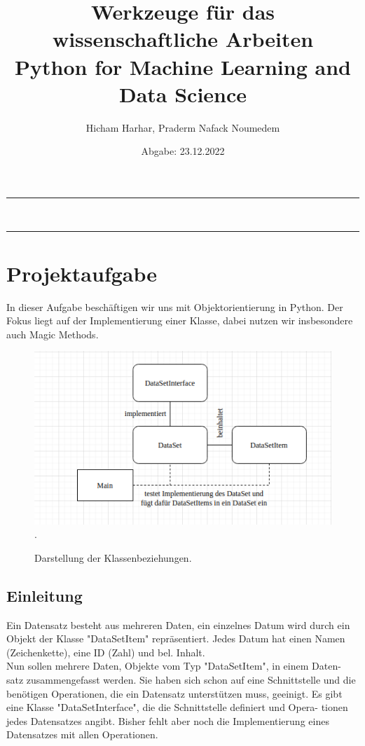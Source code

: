 \documentclass{article}
\title{Werkzeuge für das wissenschaftliche Arbeiten \\  {\large Python for Machine Learning and Data Science} }
\author{ {\large Hicham Harhar, Praderm Nafack Noumedem} }
\date{Abgabe: 23.12.2022}
\begin{document}
	
	\maketitle
\hrule\hfill\\	
	
	\tableofcontents
\hrule

	

\section{Projektaufgabe}
	In dieser Aufgabe beschäftigen wir uns mit Objektorientierung in Python. Der
	Fokus liegt auf der Implementierung einer Klasse, dabei nutzen wir insbesondere
	auch Magic Methods.
\begin{figure}[H]
		\begin{minipage}{\linewidth}
			\renewcommand{\footnoterule}{}
			\begin{center}
				\includegraphics[width=0.75\linewidth]{1.png}.
			\end{center}
			\caption[Darstellung der Klassenbeziehungen] {Darstellung der Klassenbeziehungen.}
		\end{minipage}
\end{figure}
\subsection{Einleitung}
Ein Datensatz besteht aus mehreren Daten, ein einzelnes Datum wird durch ein
Objekt der Klasse "DataSetItem" repräsentiert. Jedes Datum hat einen Namen
(Zeichenkette), eine ID (Zahl) und bel. Inhalt.\\[0.3cm]

Nun sollen mehrere Daten, Objekte vom Typ "DataSetItem", in einem Daten-
satz zusammengefasst werden. Sie haben sich schon auf eine Schnittstelle und
die benötigen Operationen, die ein Datensatz unterstützen muss, geeinigt. Es
gibt eine Klasse "DataSetInterface", die die Schnittstelle definiert und Opera-
tionen jedes Datensatzes angibt. Bisher fehlt aber noch die Implementierung
eines Datensatzes mit allen Operationen.\\[0.3cm]
\end{document}
